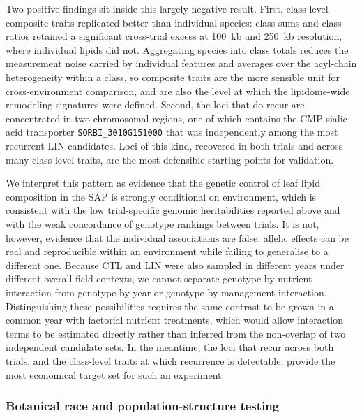 Two positive findings sit inside this largely negative result. First, class-level composite traits replicated better than individual species: class sums and class ratios retained a significant cross-trial excess at 100~kb and 250~kb resolution, where individual lipids did not. Aggregating species into class totals reduces the measurement noise carried by individual features and averages over the acyl-chain heterogeneity within a class, so composite traits are the more sensible unit for cross-environment comparison, and are also the level at which the lipidome-wide remodeling signatures were defined. Second, the loci that do recur are concentrated in two chromosomal regions, one of which contains the CMP-sialic acid transporter \texttt{SORBI\_3010G151000} that was independently among the most recurrent LIN candidates. Loci of this kind, recovered in both trials and across many class-level traits, are the most defensible starting points for validation.

We interpret this pattern as evidence that the genetic control of leaf lipid composition in the SAP is strongly conditional on environment, which is consistent with the low trial-specific genomic heritabilities reported above and with the weak concordance of genotype rankings between trials. It is not, however, evidence that the individual associations are false: allelic effects can be real and reproducible within an environment while failing to generalise to a different one. Because CTL and LIN were also sampled in different years under different overall field contexts, we cannot separate genotype-by-nutrient interaction from genotype-by-year or genotype-by-management interaction. Distinguishing these possibilities requires the same contrast to be grown in a common year with factorial nutrient treatments, which would allow interaction terms to be estimated directly rather than inferred from the non-overlap of two independent candidate sets. In the meantime, the loci that recur across both trials, and the class-level traits at which recurrence is detectable, provide the most economical target set for such an experiment.



\subsubsection{Botanical race and population-structure testing}

